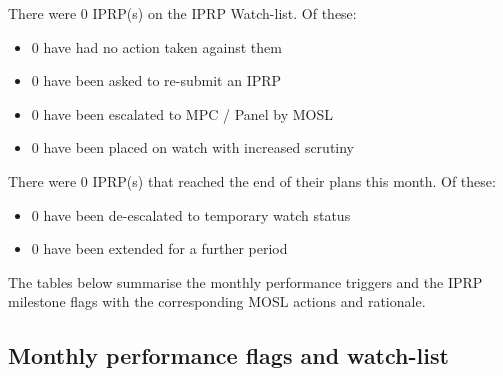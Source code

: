 \documentclass[12pt,table]{article}
\newenvironment{Shaded}{\begin{snugshade}}{\end{snugshade}}
\newcommand{\DataTypeTok}[1]{\textcolor[rgb]{0.13,0.29,0.53}{#1}}
\newcommand{\DecValTok}[1]{\textcolor[rgb]{0.00,0.00,0.81}{#1}}
\newcommand{\KeywordTok}[1]{\textcolor[rgb]{0.13,0.29,0.53}{\textbf{#1}}}
\newcommand{\NormalTok}[1]{#1}
\newcommand{\OperatorTok}[1]{\textcolor[rgb]{0.81,0.36,0.00}{\textbf{#1}}}
\newcommand{\OtherTok}[1]{\textcolor[rgb]{0.56,0.35,0.01}{#1}}
\newcommand{\StringTok}[1]{\textcolor[rgb]{0.31,0.60,0.02}{#1}}
\providecommand{\tightlist}{%
  \setlength{\itemsep}{0pt}\setlength{\parskip}{0pt}}
\begin{document}
There were 0 IPRP(s) on the IPRP Watch-list. Of these:

\begin{itemize}
\tightlist
\item
  0 have had no action taken against them
\item
  0 have been asked to re-submit an IPRP
\item
  0 have been escalated to MPC / Panel by MOSL
\item
  0 have been placed on watch with increased scrutiny
\end{itemize}

There were 0 IPRP(s) that reached the end of their plans this month. Of
these:

\begin{itemize}
\tightlist
\item
  0 have been de-escalated to temporary watch status
\item
  0 have been extended for a further period
\end{itemize}

The tables below summarise the monthly performance triggers and the IPRP
milestone flags with the corresponding MOSL actions and rationale.

\hypertarget{monthly-performance-flags-and-watch-list}{%
\subsection{Monthly performance flags and
watch-list}\label{monthly-performance-flags-and-watch-list}}

\begin{Shaded}
\end{Shaded}
\end{document}
